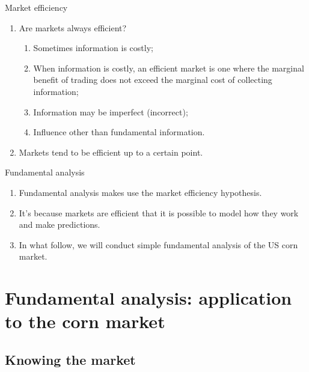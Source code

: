 \documentclass[table,xcolor=pdftex,dvipsnames, handout]{beamer}\usepackage[]{graphicx}\usepackage[]{color}
\begin{document}

\begin{frame}{Market efficiency}
\begin{enumerate}[label=\textbullet]
  \item Are markets always efficient?
    \begin{enumerate}[label=-]
         \item Sometimes information is costly;
         \item When information is costly, an efficient market is one where the marginal benefit of trading does not exceed the marginal cost of collecting information;
         \item Information may be imperfect (incorrect);
         \item Influence other than fundamental information.
    \end{enumerate}
  \item Markets tend to be efficient up to a certain point.
\end{enumerate}
\end{frame}


\begin{frame}{Fundamental analysis}
\begin{enumerate}[label=\textbullet]
  \item Fundamental analysis makes use the market efficiency hypothesis.
  \item It's because markets are efficient that it is possible to model how they work and make predictions.
  \item In what follow, we will conduct simple fundamental analysis of the US corn market.
\end{enumerate}
\end{frame}


\section{Fundamental analysis: application to the corn market}

\subsection{Knowing the market}
\end{document}
